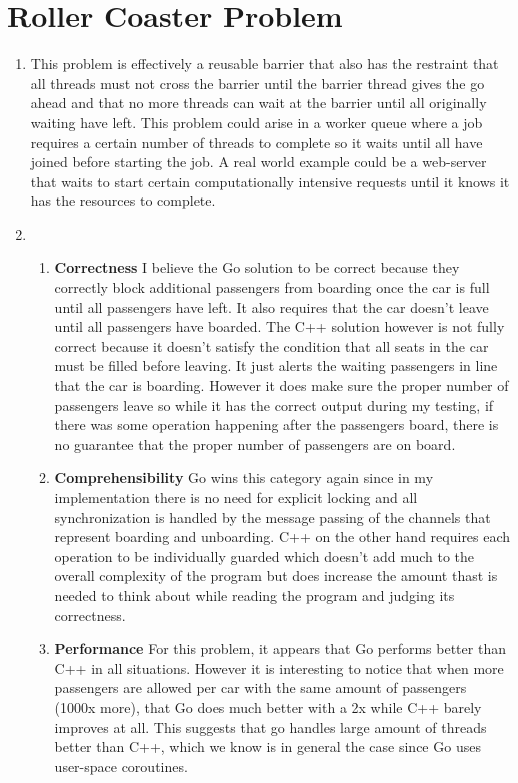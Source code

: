 \documentclass[11pt]{article}
\begin{document}
\section{Roller Coaster Problem}
\begin{enumerate}
	\item This problem is effectively a reusable barrier that also has the restraint that all threads must not cross the barrier until the barrier thread gives the go ahead and that no more threads can wait at the barrier until all originally waiting have left. This problem could arise in a worker queue where a job requires a certain number of threads to complete so it waits until all have joined before starting the job. A real world example could be a web-server that waits to start certain computationally intensive requests until it knows it has the resources to complete.
	\item
	\begin{enumerate}
	\item \textbf{Correctness}\linebreak
	I believe the Go solution to be correct because they correctly block additional passengers from boarding once the car is full until all passengers have left. It also requires that the car doesn't leave until all passengers have boarded. The C++ solution however is not fully correct because it doesn't satisfy the condition that all seats in the car must be filled before leaving. It just alerts the waiting passengers in line that the car is boarding. However it does make sure the proper number of passengers leave so while it has the correct output during my testing, if there was some operation happening after the passengers board, there is no guarantee that the proper number of passengers are on board.
	\item \textbf{Comprehensibility}\linebreak
	Go wins this category again since in my implementation there is no need for explicit locking and all synchronization is handled by the message passing of the channels that represent boarding and unboarding. C++ on the other hand requires each operation to be individually guarded which doesn't add much to the overall complexity of the program but does increase the amount thast is needed to think about while reading the program and judging its correctness.
	\item \textbf{Performance}\linebreak
	For this problem, it appears that Go performs better than C++ in all situations. However it is interesting to notice that when more passengers are allowed per car with the same amount of passengers (1000x more), that Go does much better with a 2x while C++ barely improves at all. This suggests that go handles large amount of threads better than C++, which we know is in general the case since Go uses user-space coroutines.
	\end{enumerate}
\end{enumerate}
\end{document}
